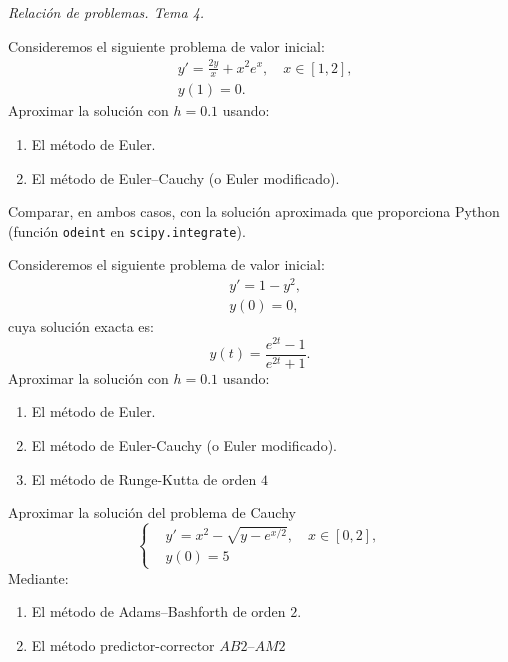 \documentclass[11pt]{article}
\begin{document}
\begin{flushright}
  \LARGE\it Relación de problemas. Tema \huge 4.\\
  \bigskip
\end{flushright}

\begin{problemas}

  \begin{problema}
    Consideremos el siguiente problema de valor inicial:
    \begin{align*}
      &y'=\frac{2y}{x} + x^2e^x, \quad x\in[1,2],\\
      &y(1)=0.
    \end{align*}
    Aproximar la solución con $h=0.1$ usando:
    \begin{enumerate}
    \item El método de Euler.
    \item El método de Euler--Cauchy (o Euler modificado).
    \end{enumerate}
    Comparar, en ambos casos, con la solución aproximada que
    proporciona Python (función \texttt{odeint} en
    \texttt{scipy.integrate}).
  \end{problema}
  
  \begin{problema}%
    Consideremos el siguiente problema de valor inicial:
    \begin{align*}
      &y'=1-y^2,\\
      &y(0)=0,
    \end{align*}
    cuya solución exacta es:
    $$ y(t) = \frac{e^{2t}-1}{e^{2t}+1}.$$
    Aproximar la solución con $h=0.1$ usando:
    \begin{enumerate}
    \item El método de Euler.
    \item El método de Euler-Cauchy (o Euler
      modificado).
    \item El método de Runge-Kutta de orden $4$
    \end{enumerate}
  \end{problema}

  \begin{problema}
    Aproximar la solución del problema de Cauchy
    \begin{equation*}
      \left\{
      \begin{aligned}
        &y'=x^2 - \sqrt{y-e^{x/2}}, \quad x\in[0,2], \\
        &y(0)=5
      \end{aligned}
      \right.
    \end{equation*}
    Mediante:
    \begin{enumerate}
    \item El método de Adams--Bashforth de orden $2$.
    \item El método predictor-corrector $AB2$--$AM2$
    \end{enumerate}
  \end{problema}
  

\end{problemas}
\end{document}
